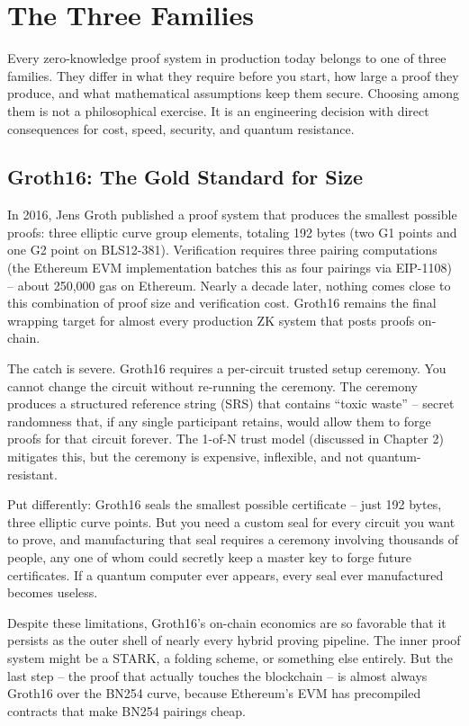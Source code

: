 \documentclass[
  11pt,
  openany]{report}
\begin{document}
\section{The Three Families}\label{the-three-families}

Every zero-knowledge proof system in production today belongs to one of three
families. They differ in what they require before you start, how large a proof
they produce, and what mathematical assumptions keep them secure. Choosing among
them is not a philosophical exercise. It is an engineering decision with direct
consequences for cost, speed, security, and quantum resistance.

\subsection{Groth16: The Gold Standard for
Size}\label{groth16-the-gold-standard-for-size}

In 2016, Jens Groth published a proof system that produces the smallest possible
proofs: three elliptic curve group elements, totaling 192 bytes (two G1 points
and one G2 point on BLS12-381). Verification requires three pairing computations
(the Ethereum EVM implementation batches this as four pairings via EIP-1108) --
about 250,000 gas on Ethereum. Nearly a decade later, nothing comes close to
this combination of proof size and verification cost. Groth16 remains the final
wrapping target for almost every production ZK system that posts proofs
on-chain.

The catch is severe. Groth16 requires a per-circuit trusted setup ceremony. You
cannot change the circuit without re-running the ceremony. The ceremony produces
a structured reference string (SRS) that contains ``toxic waste'' -- secret
randomness that, if any single participant retains, would allow them to forge
proofs for that circuit forever. The 1-of-N trust model (discussed in Chapter 2)
mitigates this, but the ceremony is expensive, inflexible, and not
quantum-resistant.

Put differently: Groth16 seals the smallest possible certificate -- just 192
bytes, three elliptic curve points. But you need a custom seal for every circuit
you want to prove, and manufacturing that seal requires a ceremony involving
thousands of people, any one of whom could secretly keep a master key to forge
future certificates. If a quantum computer ever appears, every seal ever
manufactured becomes useless.

Despite these limitations, Groth16's on-chain economics are so favorable that it
persists as the outer shell of nearly every hybrid proving pipeline. The inner
proof system might be a STARK, a folding scheme, or something else entirely. But
the last step -- the proof that actually touches the blockchain -- is almost
always Groth16 over the BN254 curve, because Ethereum's EVM has precompiled
contracts that make BN254 pairings cheap.
\end{document}
